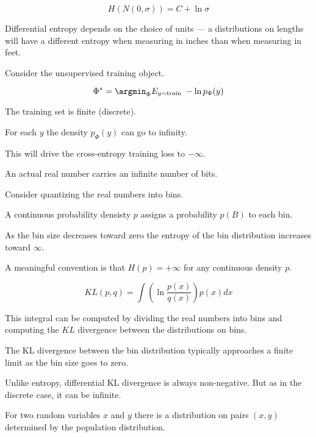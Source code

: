 {

$$H(N(0,\sigma)) = C + \ln \sigma$$

\vfill
Differential entropy depends on the choice of units --- a distributions on lengths will have a different entropy
when measuring in inches than when measuring in feet.


Consider the unsupervised training object.

$$\Phi^* = \argmin_\Phi E_{y \sim \mathrm{train}}\;-\ln p_\Phi(y)$$

\vfill
The training set is finite (discrete).

\vfill
For each $y$ the density $p_\Phi(y)$ can go to infinity.

\vfill
This will drive the cross-entropy training loss to $-\infty$.


An actual real number carries an infinite number of bits.

\vfill
Consider quantizing the real numbers into bins.

\vfill
A continuous probability densisty $p$ assigns a probability $p(B)$ to each bin.

\vfill
As the bin size decreases toward zero the entropy of the bin distribution increases toward $\infty$.

\vfill
A meaningful convention is that $H(p) = +\infty$ for any continuous density $p$.


$$KL(p,q) = \int \left( \ln \frac{p(x)}{q(x)}\right) p(x) dx$$

\vfill
This integral can be computed by dividing the real numbers into bins and computing the $KL$ divergence between the distributions on bins.

\vfill
The KL divergence between the bin distribution typically approaches a finite limit as the bin size goes to zero.

\vfill
Unlike entropy, differential KL divergence is always non-negative.  But as in the discrete case, it can be infinite.


For two random variables $x$ and $y$ there is a distribution on pairs $(x,y)$ determined by the population distribution.

}
